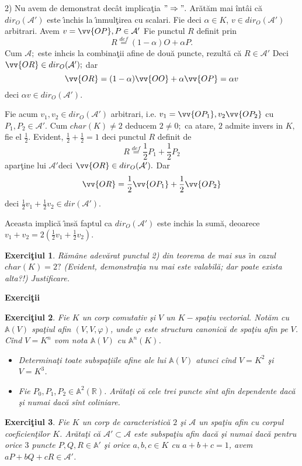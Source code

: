 \documentclass[12pt]{book}
\def\Ac{\mathcal A}
\def\defq{\stackrel{def}{=}}
\newtheorem{exe}{Exerci\c tiul }
\begin{document}
2) Nu avem de demonstrat dec\^at implica\c tia $"\Rightarrow".$ Ar\u at\u am mai \^int\^ai c\u a $dir_O(\Ac')$ este \^{\i}nchis la \^{\i}nmul\c tirea cu scalari. Fie deci $\alpha\in K$, $v\in dir_O(\Ac')$ arbitrari.
Avem $v=\vv{OP}, P\in \Ac'$ Fie punctul $R$ definit prin
$$R\defq(1-\alpha)O+\alpha P.$$
Cum $\Ac;$ este inhcis la combina\c tii afine de dou\u a puncte, rezult\u a c\u a  $R\in \Ac'$ Deci $\vv{OR}\in dir_O(\Ac');$ dar
$$\vv{OR}=(1-\alpha)\vv{OO}+\alpha \vv{OP}=\alpha v$$
deci $\alpha v\in dir_O(\Ac').$

Fie acum $v_1, v_2\in dir_O(\Ac')$ arbitrari, i.e. $v_1=\vv{OP_1}, v_2\vv{OP_2}$ cu $P_1, P_2\in \Ac'.$
Cum $char(K)\not=2$ deducem $2\not=0;$ ca atare, $2$ admite invers in $K,$ fie el $\frac{1}{2}.$
Evident, $\frac{1}{2}+\frac{1}{2}=1$ deci punctul $R$ definit de
$$R\defq \frac{1}{2}P_1+\frac{1}{2}P_2$$ 
apar\c tine lui $\Ac'$deci $\vv{OR}\in dir_O(\Ac').$
Dar
$$\vv{OR}=\frac{1}{2}\vv{OP_1}+\frac{1}{2}\vv{OP_2}$$
deci $\frac{1}{2}{v_1}+\frac{1}{2}v_2\in dir(\Ac').$

Aceasta implic\u a \^{\i}ns\u a faptul ca $dir_O(\Ac')$ este inchis la sum\u a, deoarece
$v_1+v_2=2(\frac{1}{2}v_1+\frac{1}{2}v_2).$


\begin{exe}
R\u am\^ane adev\u arat punctul 2) din teorema de mai sus \^{\i}n cazul $char(K)=2?$ (Evident, demonstra\c tia nu mai este valabil\u a; dar poate exista alta?!) Justificare.
\end{exe}
\begin{center} {\bf Exerci\c tii}
\end{center}
\begin{exe}
Fie $K$ un corp comutativ \c si $V$ un $K-$spa\c tiu vectorial. Not\u am cu 
$\mathbb{A}(V)$ spa\c tiul afin $(V,V,\varphi)$, unde $\varphi$ este structura
canonic\u  a de spa\c tiu afin pe $V$. C\^ind $V=K^n$ vom nota $\mathbb{A}(V)$
cu $\mathbb{A}^n(K)$.
\begin{itemize}
\item[a)] Determina\c ti toate subspa\c tiile afine ale lui $\mathbb{A}(V)$ atunci 
c\^ind $V=K^2$ \c si $V=K^3$.
\item[b)] Fie $P_0,P_1,P_2 \in \mathbb{A}^2(\mathbb{R})$. Ar\u ata\c ti c\u a cele trei puncte s\^int afin dependente dac\u a \c si numai dac\u a s\^int coliniare.
\end{itemize} 
\end{exe}
\begin{exe}
Fie $K$ un corp de caracteristic\u a $2$ \c si $\mathcal{A}$ un spa\c tiu afin cu
corpul coeficien\c tilor $K$. Ar\u ata\c ti c\u a $\mathcal{A}' \subset \mathcal{A}$
este subspa\c tiu afin dac\u a \c si numai dac\u a pentru orice $3$ puncte $P,Q,R \in 
\mathbb{A}'$ \c si orice $a,b,c \in K$ cu $a+b+c=1$, avem $aP+bQ+cR \in
\mathcal{A}'$.
\end{exe}
\newpage
\end{document}
